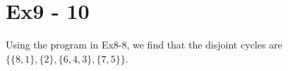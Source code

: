 \section*{Ex9 - 10}
Using the program in Ex8-8, we find that the disjoint cycles are $ \{\{8, 1\}, \{2\}, \{6, 4, 3\}, \{7, 5\}\} $.